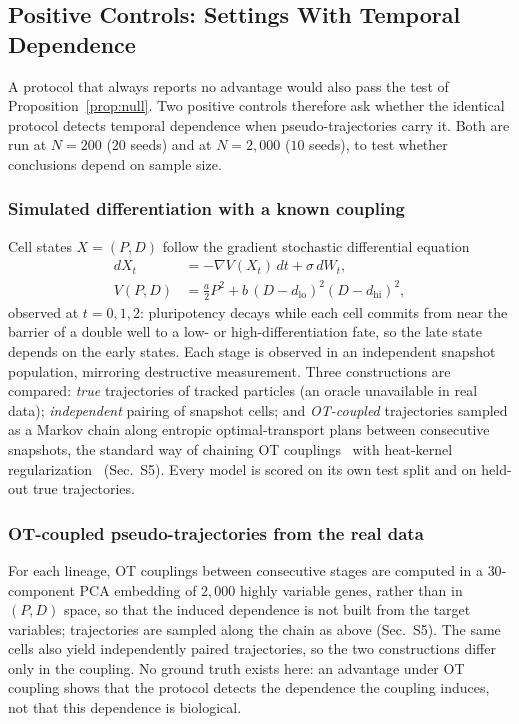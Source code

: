 \documentclass[10pt,journal,compsoc]{IEEEtran}
\begin{document}
\subsection{Positive Controls: Settings With Temporal Dependence}
\label{subsec:positive}

A protocol that always reports no advantage would also pass the test of Proposition~\ref{prop:null}. Two positive controls therefore ask whether the identical protocol detects temporal dependence when pseudo-trajectories carry it. Both are run at $N=200$ ($20$ seeds) and at $N=2{,}000$ ($10$ seeds), to test whether conclusions depend on sample size.

\subsubsection{Simulated differentiation with a known coupling} Cell states $X=(P,D)$ follow the gradient stochastic differential equation
\begin{equation}
\begin{aligned}
dX_t&=-\nabla V(X_t)\,dt+\sigma\,dW_t,\\
V(P,D)&=\tfrac{a}{2}P^2+b\,(D-d_{\mathrm{lo}})^2(D-d_{\mathrm{hi}})^2,
\end{aligned}
\label{eq:sde}
\end{equation}
observed at $t=0,1,2$: pluripotency decays while each cell commits from near the barrier of a double well to a low- or high-differentiation fate, so the late state depends on the early states. Each stage is observed in an independent snapshot population, mirroring destructive measurement. Three constructions are compared: \emph{true} trajectories of tracked particles (an oracle unavailable in real data); \emph{independent} pairing of snapshot cells; and \emph{OT-coupled} trajectories sampled as a Markov chain along entropic optimal-transport plans between consecutive snapshots, the standard way of chaining OT couplings~\cite{schiebinger2019optimal} with heat-kernel regularization~\cite{lavenant2024toward} (Sec.~S5). Every model is scored on its own test split and on held-out true trajectories.

\subsubsection{OT-coupled pseudo-trajectories from the real data} For each lineage, OT couplings between consecutive stages are computed in a $30$-component PCA embedding of $2{,}000$ highly variable genes, rather than in $(P,D)$ space, so that the induced dependence is not built from the target variables; trajectories are sampled along the chain as above (Sec.~S5). The same cells also yield independently paired trajectories, so the two constructions differ only in the coupling. No ground truth exists here: an advantage under OT coupling shows that the protocol detects the dependence the coupling induces, not that this dependence is biological.
\end{document}
